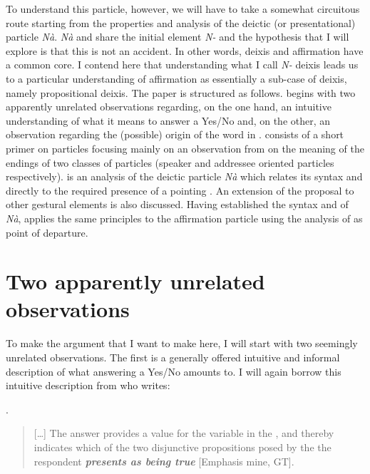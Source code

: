\documentclass[output=paper]{LSP/langsci}
\begin{document}
To understand this particle, however, we will have to take a somewhat circuitous route starting from the properties and analysis of the deictic (or presentational) particle \textit{N\`{a}}.  \textit{N\`{a}} and \nai share the initial element \textit{N-} and the hypothesis that I will explore is that this is not an accident.  In other words, deixis and affirmation have a common core.  I contend here that understanding what I call \textit{N-} deixis leads us to a particular understanding of affirmation as essentially a sub-case of deixis, namely propositional deixis.
The paper is structured as follows.   begins with two apparently unrelated observations regarding, on the one hand, an intuitive understanding of what it means to answer a Yes/No  and, on the other, an observation regarding the (possible) origin of the word \nai in .   consists of a short primer on  particles focusing mainly on an observation from \citet{tsoulas:15b} on the meaning of the endings of two classes of particles (speaker and addressee oriented particles respectively).
 is an analysis of the deictic  particle \textit{N\`{a}} which relates its syntax and  directly to the required presence of a pointing .  An extension of the proposal to other gestural elements is also discussed.
Having established the syntax and  of \textit{N\`{a}},  applies the same principles  to the affirmation particle \nai using the analysis of \citet{holmberg:15} as point of departure.


\section{Two apparently unrelated observations}
\label{sec2}
To make the argument that I want to make here, I will start with two seemingly unrelated observations.  The first is a generally offered intuitive and informal description of what answering a Yes/No  amounts to.  I will again {borrow} this intuitive description from \citet{holmberg:15} who writes:

\Lsciex.
\begin{quote}
  [\ldots] The answer provides a value for the variable in the , and thereby indicates which of the two disjunctive propositions posed by the  the respondent \textit{\textbf{presents as being true}} [Emphasis mine, GT]. 
\end{quote}
\end{document}
